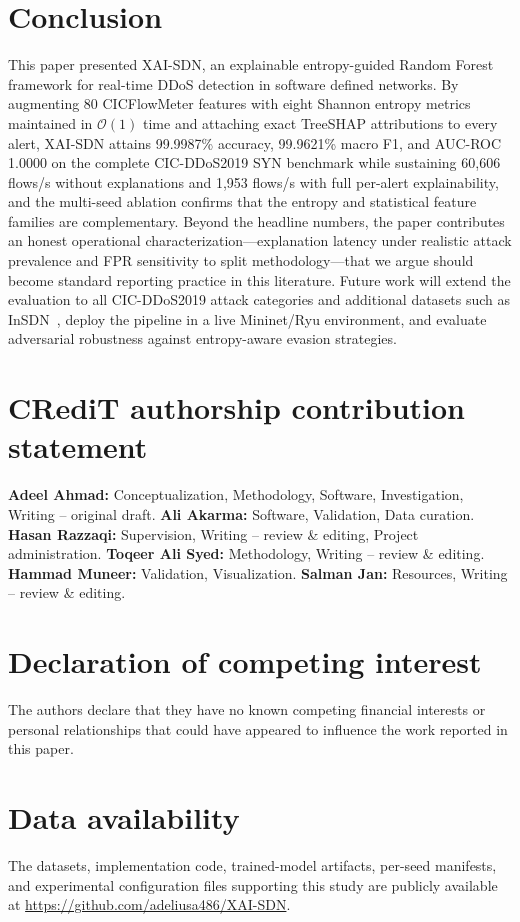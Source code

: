 ﻿\documentclass[review,12pt]{elsarticle}
\begin{document}
\section{Conclusion}
\label{sec:conclusion}

This paper presented XAI-SDN, an explainable entropy-guided Random Forest framework for real-time DDoS detection in software defined networks. By augmenting 80 CICFlowMeter features with eight Shannon entropy metrics maintained in $\mathcal{O}(1)$ time and attaching exact TreeSHAP attributions to every alert, XAI-SDN attains 99.9987\% accuracy, 99.9621\% macro F1, and AUC-ROC 1.0000 on the complete CIC-DDoS2019 SYN benchmark while sustaining 60,606 flows/s without explanations and 1,953 flows/s with full per-alert explainability, and the multi-seed ablation confirms that the entropy and statistical feature families are complementary. Beyond the headline numbers, the paper contributes an honest operational characterization---explanation latency under realistic attack prevalence and FPR sensitivity to split methodology---that we argue should become standard reporting practice in this literature. Future work will extend the evaluation to all CIC-DDoS2019 attack categories and additional datasets such as InSDN~\cite{elsayed2020insdn}, deploy the pipeline in a live Mininet/Ryu environment, and evaluate adversarial robustness against entropy-aware evasion strategies.

\section*{CRediT authorship contribution statement}
\textbf{Adeel Ahmad:} Conceptualization, Methodology, Software, Investigation, Writing -- original draft. \textbf{Ali Akarma:} Software, Validation, Data curation. \textbf{Hasan Razzaqi:} Supervision, Writing -- review \& editing, Project administration. \textbf{Toqeer Ali Syed:} Methodology, Writing -- review \& editing. \textbf{Hammad Muneer:} Validation, Visualization. \textbf{Salman Jan:} Resources, Writing -- review \& editing.

\section*{Declaration of competing interest}
The authors declare that they have no known competing financial interests or personal relationships that could have appeared to influence the work reported in this paper.

\section*{Data availability}
The datasets, implementation code, trained-model artifacts, per-seed manifests, and experimental configuration files supporting this study are publicly available at \url{https://github.com/adeliusa486/XAI-SDN}.



\end{document}
